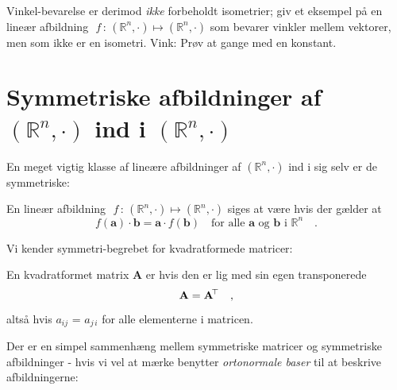 \begin{aha}
Vinkel-bevarelse er derimod {\em{ikke}} forbeholdt isometrier; giv et eksempel på en lineær afbildning $\,\,f\, : \, (\mathbb{R}^{n}, \cdot) \mapsto (\mathbb{R}^{n}, \cdot)$ som bevarer vinkler mellem vektorer, men som ikke er en isometri. Vink: Prøv at gange med en konstant.
\end{aha}


\section{Symmetriske afbildninger af $(\mathbb{R}^{n}, \cdot)$ ind i $(\mathbb{R}^{n}, \cdot)$ } \label{secSymLinAfb}

En meget vigtig klasse af lineære afbildninger af  $(\mathbb{R}^{n}, \cdot)$ ind i sig selv er de symmetriske:

\begin{definition}
En lineær afbildning $\,\,f\, : \, (\mathbb{R}^{n}, \cdot) \mapsto (\mathbb{R}^{n}, \cdot)$ siges at være  hvis der gælder at
\begin{equation}
f(\mathbf{a}) \cdot \mathbf{b} = \mathbf{a} \cdot f(\mathbf{b}) \quad \textrm{for alle $\mathbf{a}$ og $\mathbf{b}$ i $\mathbb{R}^{n}$} \quad .
\end{equation}
\end{definition}

Vi kender symmetri-begrebet for kvadratformede matricer:

\begin{definition}
En kvadratformet matrix $\mathbf{A}$ er  hvis den er lig med sin egen transponerede
\begin{equation}
\mathbf{A} = \mathbf{A}\hspace*{-.6mm}^{\top} \quad ,
\end{equation}
altså hvis $a_{ij}$ = $a_{j\,i}$ for alle elementerne i matricen.
\end{definition}

Der er en simpel sammenhæng mellem symmetriske matricer og symmetriske afbildninger - hvis vi vel at mærke benytter {\em{ortonormale baser}} til at beskrive afbildningerne:


